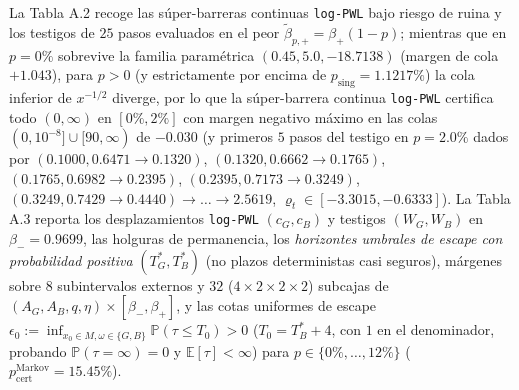 \documentclass[11pt,letterpaper]{article}
\theoremstyle{plain}
\begin{document}
La Tabla A.2 recoge las súper-barreras continuas \texttt{log-PWL} bajo riesgo de ruina y los testigos de $25$ pasos evaluados en el peor $\tilde{\beta}_{p,+}=\beta_+(1-p)$; mientras que en $p=0\%$ sobrevive la familia paramétrica $(0.45, 5.0, -18.7138)$ (margen de cola $+1.043$), para $p>0$ (y estrictamente por encima de $p_{\mathrm{sing}}=1.1217\%$) la cola inferior de $x^{-1/2}$ diverge, por lo que la súper-barrera continua \texttt{log-PWL} certifica todo $(0,\infty)$ en $[0\%,2\%]$ con margen negativo máximo en las colas $(0,10^{-8}]\cup[90,\infty)$ de $-0.030$ (y primeros $5$ pasos del testigo en $p=2.0\%$ dados por $(0.1000,0.6471\to 0.1320)$, $(0.1320,0.6662\to 0.1765)$, $(0.1765,0.6982\to 0.2395)$, $(0.2395,0.7173\to 0.3249)$, $(0.3249,0.7429\to 0.4440)\to\dots\to 2.5619$, $\varrho_t\in[-3.3015,-0.6333]$). La Tabla A.3 reporta los desplazamientos \texttt{log-PWL} $(c_G, c_B)$ y testigos $(W_G, W_B)$ en $\beta_-=0.9699$, las holguras de permanencia, los \emph{horizontes umbrales de escape con probabilidad positiva} $(T^*_G, T^*_B)$ (no plazos deterministas casi seguros), márgenes sobre $8$ subintervalos externos y $32$ ($4\times 2\times 2\times 2$) subcajas de $(A_G, A_B, q, \eta)\times[\beta_-,\beta_+]$, y las cotas uniformes de escape $\epsilon_0:=\inf_{x_0\in M,\omega\in\{G,B\}}\mathbb{P}(\tau\le T_0)>0$ ($T_0=T^*_B+4$, con $1$ en el denominador, probando $\mathbb{P}(\tau=\infty)=0$ y $\mathbb{E}[\tau]<\infty$) para $p\in\{0\%,\dots,12\%\}$ ($p_{\mathrm{cert}}^{\mathrm{Markov}}=15.45\%$).
\end{document}
